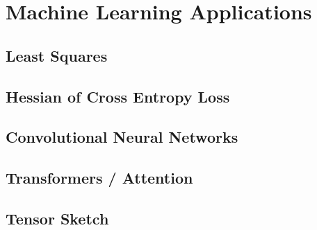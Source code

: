 
\chapter{Machine Learning Applications}

\section{Least Squares}

\section{Hessian of Cross Entropy Loss}

\section{Convolutional Neural Networks}

\section{Transformers / Attention}

\section{Tensor Sketch}
